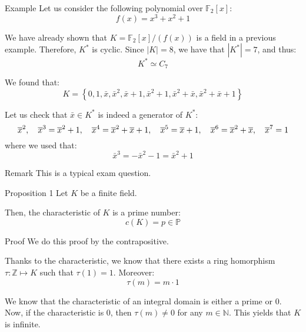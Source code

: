 \documentclass[a4paper]{article}
\begin{document}
\begin{parag}{Example}
    Let us consider the following polynomial over $\mathbb{F}_2\left[x\right]$: 
    \[f\left(x\right) = x^3 + x^2 + 1\]

    We have already shown that $K = \mathbb{F}_2\left[x\right] / \left(f\left(x\right)\right)$ is a field in a previous example. Therefore, $K^*$ is cyclic. Since $\left|K\right| = 8$, we have that $\left|K^*\right| = 7$, and thus: 
    \[K^* \simeq C_7\]
    
    We found that: 
    \[K = \left\{0, 1, \bar{x}, \bar{x}^2, \bar{x} + 1, \bar{x}^2 + 1, \bar{x}^2 + \bar{x}, \bar{x}^2 + \bar{x} + 1\right\}\]

    Let us check that $\bar{x} \in K^*$ is indeed a generator of $K^*$: 
    \[\overline{x}^2, \quad \overline{x}^3 = \overline{x}^2 + 1, \quad \overline{x}^4 = \overline{x}^2 + \overline{x} + 1, \quad \overline{x}^5 = \overline{x} + 1, \quad \overline{x}^6 = \overline{x}^2 + \overline{x}, \quad \overline{x}^7 = 1\]
    where we used that: 
    \[\bar{x}^3 = -\bar{x}^2 - 1 = \bar{x}^2 + 1\]
    
    \begin{subparag}{Remark}
        This is a typical exam question.
    \end{subparag}
\end{parag}

\begin{parag}{Proposition 1}
    Let $K$ be a finite field.

    Then, the characteristic of $K$ is a prime number: 
    \[c\left(K\right) = p \in \mathbb{P}\]
    
    \begin{subparag}{Proof}
        We do this proof by the contrapositive.

        Thanks to the characteristic, we know that there exists a ring homorphism $\tau: \mathbb{Z} \mapsto K$ such that $\tau\left(1\right) = 1$. Moreover: 
        \[\tau\left(m\right) = m\cdot 1\]

        We know that the characteristic of an integral domain is either a prime or 0. Now, if the characteristic is 0, then $\tau\left(m\right) \neq 0$ for any $m \in \mathbb{N}$. This yields that $K$ is infinite.
    \end{subparag}
\end{parag}
\end{document}
